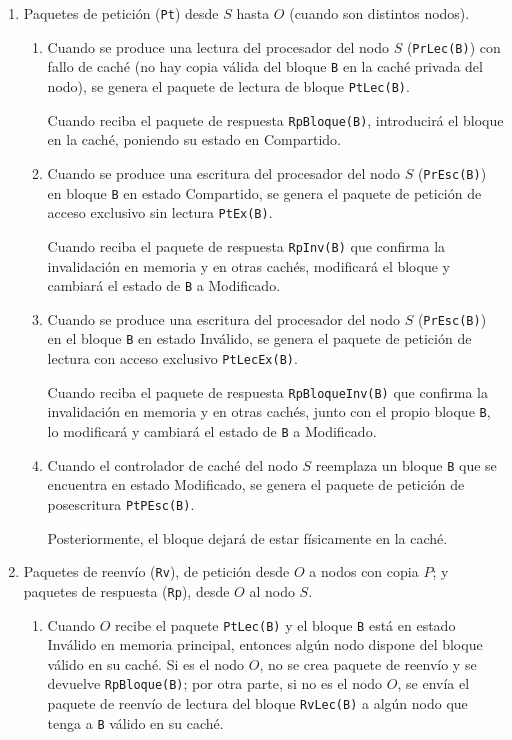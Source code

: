 \begin{enumerate}
    \item Paquetes de petición (\verb|Pt|) desde $S$ hasta $O$ (cuando son distintos nodos).
    \begin{enumerate}
        \item Cuando se produce una lectura del procesador del nodo $S$ (\verb|PrLec(B)|) con fallo de caché (no hay copia válida del bloque \verb|B| en la caché privada del nodo), se genera el paquete de lectura de bloque \verb|PtLec(B)|. 

            Cuando reciba el paquete de respuesta \verb|RpBloque(B)|, introducirá el bloque en la caché, poniendo su estado en Compartido.
        \item Cuando se produce una escritura del procesador del nodo $S$ (\verb|PrEsc(B)|) en bloque \verb|B| en estado Compartido, se genera el paquete de petición de acceso exclusivo sin lectura \verb|PtEx(B)|.

            Cuando reciba el paquete de respuesta \verb|RpInv(B)| que confirma la invalidación en memoria y en otras cachés, modificará el bloque y cambiará el estado de \verb|B| a Modificado.
        \item Cuando se produce una escritura del procesador del nodo $S$ (\verb|PrEsc(B)|) en el bloque \verb|B| en estado Inválido, se genera el paquete de petición de lectura con acceso exclusivo \verb|PtLecEx(B)|.

            Cuando reciba el paquete de respuesta \verb|RpBloqueInv(B)| que confirma la invalidación en memoria y en otras cachés, junto con el propio bloque \verb|B|, lo modificará y cambiará el estado de \verb|B| a Modificado.
        \item Cuando el controlador de caché del nodo $S$ reemplaza un bloque \verb|B| que se encuentra en estado Modificado, se genera el paquete de petición de posescritura \verb|PtPEsc(B)|.

            Posteriormente, el bloque dejará de estar físicamente en la caché.
    \end{enumerate}
    \item Paquetes de reenvío (\verb|Rv|), de petición desde $O$ a nodos con copia $P$; y paquetes de respuesta (\verb|Rp|), desde $O$ al nodo $S$.
    \begin{enumerate}
        \item Cuando $O$ recibe el paquete \verb|PtLec(B)| y el bloque \verb|B| está en estado Inválido en memoria principal, entonces algún nodo dispone del bloque válido en su caché. Si es el nodo $O$, no se crea paquete de reenvío y se devuelve \verb|RpBloque(B)|; por otra parte, si no es el nodo $O$, se envía el paquete de reenvío de lectura del bloque \verb|RvLec(B)| a algún nodo que tenga a \verb|B| válido en su caché.


\end{enumerate}
\end{enumerate}
